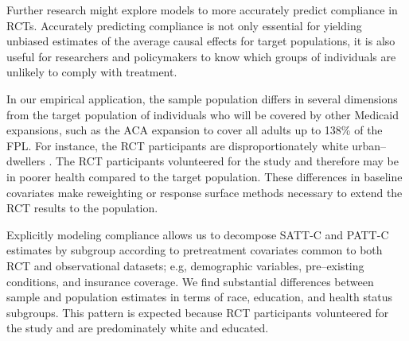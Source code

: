 \documentclass[hidelinks,12pt]{article}
\begin{document}
{Further research might explore models to more accurately predict compliance in RCTs.  Accurately predicting compliance is not only essential for yielding unbiased estimates of the average causal effects for target populations, it is also useful for researchers and policymakers to know which groups of individuals are unlikely to comply with treatment. 

In our empirical application, the sample population differs in several dimensions from the target population of individuals who will be covered by other Medicaid expansions, such as the ACA expansion to cover all adults up to 138\% of the FPL. For instance, the RCT participants are disproportionately white urban--dwellers \citep{Taubman}. The RCT participants volunteered for the study and therefore may be in poorer health compared to the target population. These differences in baseline covariates make {\color{red}reweighting or response surface methods} necessary to extend the RCT results to the population.

Explicitly modeling compliance allows us to decompose SATT-C and PATT-C estimates by subgroup according to pretreatment covariates common to both RCT and observational datasets{\color{red}; e.g, demographic variables, pre--existing conditions, and insurance coverage}. We find substantial differences between sample and population estimates in terms of race, education, and health status subgroups. This pattern is expected because RCT participants volunteered for the study and are predominately white and educated.

\pagebreak

\printbibliography


\pagebreak
\begin{appendices}
	
\newcommand{\hbAppendixPrefix}{A}
%
\renewcommand{\thefigure}{\hbAppendixPrefix\arabic{figure}}
\setcounter{figure}{0}
\renewcommand{\thetable}{\hbAppendixPrefix\arabic{table}} 
\setcounter{table}{0}
\renewcommand{\theequation}{\hbAppendixPrefix\arabic{equation}} 
\setcounter{equation}{0}



\end{appendices}}
\end{document}
